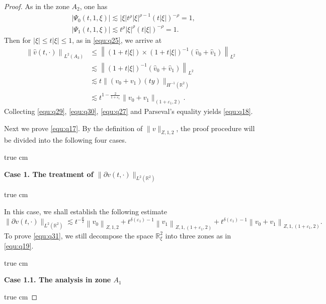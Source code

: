 \documentclass[11pt,twoside]{article}
\newcommand{\R}{\mathbb R}
\newcommand{\p}{\partial}
\newcommand{\f}{\frac}
\theoremstyle{plain}
\theoremstyle{definition}
\theoremstyle{remark}
\numberwithin{equation}{section}
\begin{document}
\begin{proof}
As in the zone $A_2$, one has
\begin{equation}\label{equ:q26}
\begin{aligned}
& \left|\Psi_0(t, 1,\xi)\right| \lesssim|\xi| t^\rho|\xi|^{\rho-1}(t|\xi|)^{-\rho}=1, \\
& \left|\Psi_1(t, 1, \xi)\right|  \lesssim t^\rho|\xi|^{\rho}(t|\xi|)^{-\rho}=1.
\end{aligned}
\end{equation}
Then for $|\xi|\leq t|\xi| \leq 1$, as in \eqref{equ:q25}, we arrive at
\begin{equation}\label{equ:q27}
\begin{aligned}
\left\|\hat{v}(t, \cdot)\right\|_{L^2(A_3)} & \leq\left\|(1+t|\xi|)\times(1+t|\xi|)^{-1}(\hat{v}_{0}+\hat{v}_{1})\right\|_{L^{2}} \\
&\lesssim\left\|(1+t|\xi|)^{-1}(\hat{v}_{0}+\hat{v}_{1})\right\|_{L^{2}}\\
& \lesssim t\|(v_0+v_1)(ty)\|_{H^{-1}(\R^2)}\\
&\lesssim t^{1-\f{2}{1+\varepsilon_1}}\|v_0+v_1\|_{(1+\varepsilon_1, 2)}.
\end{aligned}
\end{equation}
Collecting \eqref{equ:q29}, \eqref{equ:q30}, \eqref{equ:q27} and Parseval's equality yields \eqref{equ:q18}.

Next we prove \eqref{equ:q17}. By the definition of $\|v\|_{Z, 1,2}$,
the proof procedure will be divided into the following four cases.

 true cm

{\bf Case 1.  The treatment  of $\|\p v(t, \cdot)\|_{L^2(\R^2)}$ }

 true cm

In this case, we shall establish the following estimate
\begin{equation}\label{equ:q31}
\|\p v(t, \cdot)\|_{L^2(\R^2)} \lesssim t^{-\f{\mu}{2}}\left\|v_0\right\|_{Z, 1, 2}+t^{\delta(\varepsilon_1)-1}\left\|v_1\right\|_{Z, 1,(1+\varepsilon_1, 2)}+t^{\delta(\varepsilon_1)-1}\left\|v_0+v_1\right\|_{Z, 1,(1+\varepsilon_1, 2)}.
\end{equation}
To prove \eqref{equ:q31}, we still
decompose the space $\R_{\xi}^2$ into three zones as in \eqref{equ:q19}.

 true cm

{\bf Case 1.1.  The analysis  in zone $A_1$}

 true cm


\end{proof}
\end{document}
